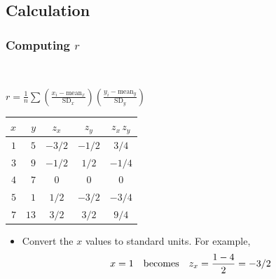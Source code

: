\documentclass[t]{beamer}
\begin{document}
\subsection{Calculation}
\begin{frame}
\frametitle{Computing $r$}
\newcommand{\Z}{\hphantom{0}}
\newcommand{\VP}{\vphantom{\Large Y}}
\newcommand{\M}{\hphantom{$-$}}
\scriptsize
{\ }\vspace{-17pt}

\begin{center}
$\displaystyle r=\frac{1}{n}\sum \left(\frac{x_i - \mbox{mean}_x}{\mbox{SD}_x}\right)\!
   \left(\frac{y_i - \mbox{mean}_y}{\mbox{SD}_y}\right)$\hspace{10pt}
\begin{tabular}{|rr|ccc|}\hline
$x$ & $y$ & $z_x$ & $z_y$ & $z_x\,z_y$ \\[2pt]\hline
$1$   & $5$   & $-3/2$\M  & $-1/2$\M & $3/4$ \VP\\
$3$   & $9$   & $-1/2$\M  & $1/2$   & $-1/4$\M \\
$4$   & $7$   & $0$     & $0$     & $0$        \\
$5$   & $1$   & $1/2$   & $-3/2$\M  & $-3/4$\M  \\
$7$   & $13$  & $3/2$   & $3/2$   & $9/4$       \\\hline
\end{tabular}\vspace{-8pt}
\end{center}
\tiny
{}\vspace{-2pt}
\begin{itemize}
\item<3-> Convert the $x$ values to standard units.  For example,\vspace{-3pt}
\[x = 1\mbox{\hspace{10pt}becomes\hspace{10pt}} z_x = \frac{1-4}{2} = -3/2
\]
\end{itemize}
\end{frame}
\end{document}
